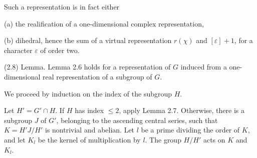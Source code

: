 \documentclass[9pt,twoside]{extarticle}
\begin{document}
{Such a representation is in fact either\par

(a) the realification of a one-dimensional complex representation,\par

(b) dihedral, hence the sum of a virtual representation \(r(\chi)\) and \([\varepsilon]+1\), for a character \(\varepsilon\) of order two.\par

(2.8) Lemma. Lemma 2.6 holds for a representation of \(G\) induced from a one-dimensional real representation of a subgroup of \(G\).\par

We proceed by induction on the index of the subgroup \(H\).\par

Let \(H'=G'\cap H\). If \(H\) has index \(\leq2\), apply Lemma 2.7. Otherwise, there is a subgroup \(J\) of \(G'\), belonging to the ascending central series, such that \(K=H'J/H'\) is nontrivial and abelian. Let \(l\) be a prime dividing the order of \(K\), and let \(K_l\) be the kernel of multiplication by \(l\). The group \(H/H'\) acts on \(K\) and \(K_l\).\par
}
\end{document}
